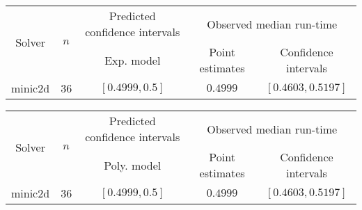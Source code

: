 \begin{tabular}{ccccc}
\hline 
\multirow{2}{*}{Solver} & \multirow{2}{*}{$n$} & Predicted confidence intervals & \multicolumn{2}{c}{Observed median  run-time}\tabularnewline
 &  & Exp. model  & Point estimates  & Confidence intervals\tabularnewline
\hline 
\hline 
\multirow{0}{*}{minic2d} & 36 & $\mathbf{\left[0.4999,0.5\right]}$ & $0.4999$ & $\left[0.4603,0.5197\right]$ \tabularnewline 
\hline 
\end{tabular} 

\begin{tabular}{ccccc}
\hline 
\multirow{2}{*}{Solver} & \multirow{2}{*}{$n$} & Predicted confidence intervals & \multicolumn{2}{c}{Observed median  run-time}\tabularnewline
 &  & Poly. model  & Point estimates  & Confidence intervals\tabularnewline
\hline 
\hline 
\multirow{0}{*}{minic2d} & 36 & $\mathbf{\left[0.4999,0.5\right]}$ & $0.4999$ & $\left[0.4603,0.5197\right]$ \tabularnewline 
\hline 
\end{tabular} 


